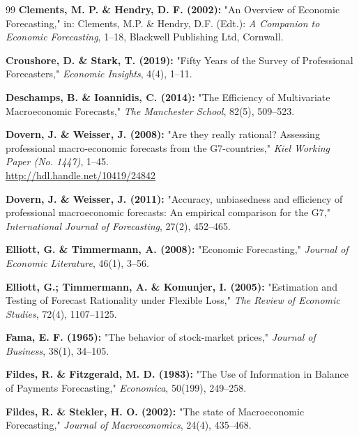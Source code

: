 \documentclass[12pt,a4paper]{article}
\begin{document}
\begin{thebibliography}{99}
	\textbf{Clements, M. P. \& Hendry, D. F. (2002):}
	"An Overview of Economic Forecasting,"
	in: Clements, M.P. \& Hendry, D.F. (Edt.):
	\emph{A Companion to Economic Forecasting}, 1--18, Blackwell Publishing Ltd, Cornwall.
	
	\textbf{Croushore, D. \& Stark, T. (2019):}
	"Fifty Years of the Survey of Professional Forecasters,"
	\emph{Economic Insights}, 4(4), 1--11.
	
	\textbf{Deschamps, B. \& Ioannidis, C. (2014):}
	"The Efficiency of Multivariate Macroeconomic Forecasts,"
	\emph{The Manchester School}, 82(5), 509--523.
	
	\textbf{Dovern, J. \& Weisser, J. (2008):}
	"Are they really rational? Assessing professional macro-economic forecasts from the G7-countries,"
	\emph{Kiel Working Paper (No. 1447)}, 1--45.\\
	\url{http://hdl.handle.net/10419/24842}
	
	\textbf{Dovern, J. \& Weisser, J. (2011):}
	"Accuracy, unbiasedness and efficiency of professional macroeconomic forecasts: An empirical comparison for the G7,"
	\emph{International Journal of Forecasting}, 27(2), 452--465.
	
	\textbf{Elliott, G. \& Timmermann, A. (2008):}
	"Economic Forecasting,"
	\emph{Journal of Economic Literature}, 46(1), 3--56.
	
	\textbf{Elliott, G.; Timmermann, A. \& Komunjer, I. (2005):}
	"Estimation and Testing of Forecast Rationality under Flexible Loss,"
	\emph{The Review of Economic Studies}, 72(4), 1107--1125.
	
	\textbf{Fama, E. F. (1965):}
	"The behavior of stock-market prices,"
	\emph{Journal of Business}, 38(1), 34--105.
	
	\textbf{Fildes, R. \& Fitzgerald, M. D. (1983):}
	"The Use of Information in Balance of Payments Forecasting,"
	\emph{Economica}, 50(199), 249--258.
	
	\textbf{Fildes, R. \& Stekler, H. O. (2002):}
	"The state of Macroeconomic Forecasting,"
	\emph{Journal of Macroeconomics}, 24(4), 435--468.
	

\end{thebibliography}
\end{document}
